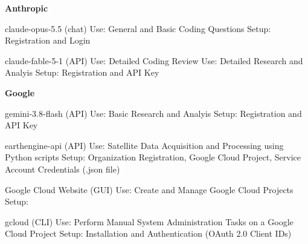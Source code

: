 \documentclass[12pt, letterpaper]{article}
\begin{document}
\begin{outline}[enumerate]
\1 \textbf{Anthropic}

\2 claude-opus-5.5 (chat)
\3 Use: General and Basic Coding Questions
\3 Setup: Registration and Login

\2 claude-fable-5-1 (API)
\3 Use: Detailed Coding Review
\3 Use: Detailed Research and Analyis
\3 Setup: Registration and API Key


\1 \textbf{Google}

\2 gemini-3.8-flash (API)
\3 Use: Basic Research and Analyis
\3 Setup: Registration and API Key

\2 earthengine-api (API)
\3 Use: Satellite Data Acquisition and Processing using Python scripts
\3 Setup: Organization Registration, Google Cloud Project, Service Account Credentials (.json file)

\2 Google Cloud Website (GUI)
\3 Use: Create and Manage Google Cloud Projects 
\3 Setup: 

\2 gcloud (CLI)
\3 Use: Perform Manual System Administration Tasks on a Google Cloud Project
\3 Setup: Installation and Authentication (OAuth 2.0 Client IDs)


\end{outline}



\section{}
\large
\begin{flushleft}
\textit{}
\end{flushleft}
\normalsize

\begin{outline}[enumerate]
\1 \textbf{}

\end{outline}





\clearpage 
\renewcommand{\thepage}{}
\printbibliography
\end{document}
